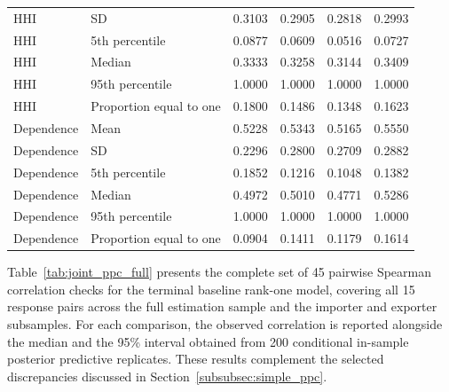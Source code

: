 \documentclass[pdftex,12pt,openright,a4paper,oneside]{book}
\begin{document}
\begin{longtable}{llrrrr}
HHI & SD & 0.3103 & 0.2905 & 0.2818 & 0.2993 \\
HHI & 5th percentile & 0.0877 & 0.0609 & 0.0516 & 0.0727 \\
HHI & Median & 0.3333 & 0.3258 & 0.3144 & 0.3409 \\
HHI & 95th percentile & 1.0000 & 1.0000 & 1.0000 & 1.0000 \\
HHI & Proportion equal to one & 0.1800 & 0.1486 & 0.1348 & 0.1623 \\
\addlinespace[2pt]
Dependence & Mean & 0.5228 & 0.5343 & 0.5165 & 0.5550 \\
Dependence & SD & 0.2296 & 0.2800 & 0.2709 & 0.2882 \\
Dependence & 5th percentile & 0.1852 & 0.1216 & 0.1048 & 0.1382 \\
Dependence & Median & 0.4972 & 0.5010 & 0.4771 & 0.5286 \\
Dependence & 95th percentile & 1.0000 & 1.0000 & 1.0000 & 1.0000 \\
Dependence & Proportion equal to one & 0.0904 & 0.1411 & 0.1179 & 0.1614 \\
\end{longtable}
\endgroup

Table~\ref{tab:joint_ppc_full} presents the complete set of 45 pairwise Spearman correlation checks for the terminal baseline rank-one model, covering all 15 response pairs across the full estimation sample and the importer and exporter subsamples. 
For each comparison, the observed correlation is reported alongside the median and the 95\% interval obtained from 200 conditional in-sample posterior predictive replicates. These results complement the selected discrepancies discussed in Section~\ref{subsubsec:simple_ppc}.
\end{document}
